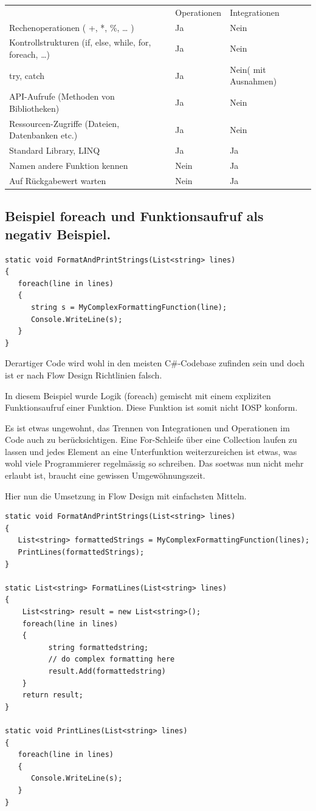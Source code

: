 \documentclass[11pt]{article}
\begin{document}
\begin{enumerate}
\begin{center}
\begin{tabular}{lll}
 & Operationen & Integrationen\\
Rechenoperationen ( +, *, \%, \ldots{} ) & Ja & Nein\\
Kontrollstrukturen (if, else, while, for, foreach, \ldots{}) & Ja & Nein\\
try, catch & Ja & Nein( mit Ausnahmen)\\
API-Aufrufe (Methoden von Bibliotheken) & Ja & Nein\\
Ressourcen-Zugriffe (Dateien, Datenbanken etc.) & Ja & Nein\\
Standard Library, LINQ & Ja & Ja\\
Namen andere Funktion kennen & Nein & Ja\\
Auf Rückgabewert warten & Nein & Ja\\
\end{tabular}
\end{center}
\end{enumerate}

\subsection{Beispiel foreach und Funktionsaufruf als negativ Beispiel.}
\label{sec:orgheadline26}
\begin{verbatim}
static void FormatAndPrintStrings(List<string> lines)
{
   foreach(line in lines)
   {
      string s = MyComplexFormattingFunction(line);
      Console.WriteLine(s);
   }
}
\end{verbatim}
Derartiger Code wird wohl in den meisten C\#-Codebase zufinden sein und doch ist er nach Flow Design Richtlinien falsch.

In diesem Beispiel wurde Logik (foreach) gemischt mit einem expliziten Funktionsaufruf einer Funktion.
Diese Funktion ist somit nicht IOSP konform.

Es ist etwas ungewohnt, das Trennen von Integrationen und Operationen im Code auch zu berücksichtigen.
Eine For-Schleife über eine Collection laufen zu lassen und jedes Element an eine Unterfunktion weiterzureichen ist etwas,
was wohl viele Programmierer regelmässig so schreiben.
Das soetwas nun nicht mehr erlaubt ist, braucht eine gewissen Umgewöhnungszeit.


Hier nun die Umsetzung in Flow Design mit einfachsten Mitteln.

\begin{verbatim}
static void FormatAndPrintStrings(List<string> lines)
{
   List<string> formattedStrings = MyComplexFormattingFunction(lines);
   PrintLines(formattedStrings);
}

static List<string> FormatLines(List<string> lines)
{
    List<string> result = new List<string>();
    foreach(line in lines)
    {
          string formattedstring;
          // do complex formatting here
          result.Add(formattedstring) 
    }
    return result;
}

static void PrintLines(List<string> lines)
{
   foreach(line in lines)
   {
      Console.WriteLine(s);
   }
}
\end{verbatim}
\end{document}
